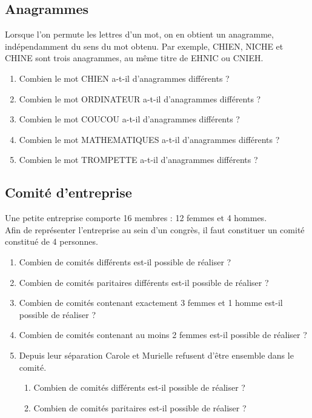 \documentclass[oneside,12pt]{article}          %
\begin{document}
\subsection{Anagrammes}
Lorsque l'on permute les lettres d'un mot, on en obtient un anagramme, indépendamment du sens du mot obtenu. Par exemple, CHIEN, NICHE et CHINE sont trois anagrammes, au même titre de EHNIC ou CNIEH.

\begin{enumerate}
    \item Combien le mot CHIEN a-t-il d'anagrammes différents ?
    \item Combien le mot ORDINATEUR a-t-il d'anagrammes différents ?
    \item Combien le mot COUCOU a-t-il d'anagrammes différents ?
    \item Combien le mot MATHEMATIQUES a-t-il d'anagrammes différents ?
    \item Combien le mot TROMPETTE a-t-il d'anagrammes différents ?
\end{enumerate}



\subsection{Comité d'entreprise}
Une petite entreprise comporte 16 membres : 12 femmes et 4 hommes.\\
Afin de représenter l'entreprise au sein d'un congrès, il faut constituer un comité constitué de 4 personnes.

\begin{enumerate}
    \item Combien de comités différents est-il possible de réaliser ?
    \item Combien de comités paritaires différents est-il possible de réaliser ?
    \item Combien de comités contenant exactement 3 femmes et 1 homme est-il possible de réaliser ?
    \item Combien de comités contenant au moins 2 femmes est-il possible de réaliser ?
    \item Depuis leur séparation Carole et Murielle refusent d'être ensemble dans le comité.
        \begin{enumerate}
            \item Combien de comités différents est-il possible de réaliser ?
            \item Combien de comités paritaires est-il possible de réaliser ?
        \end{enumerate}
\end{enumerate}
\end{document}
